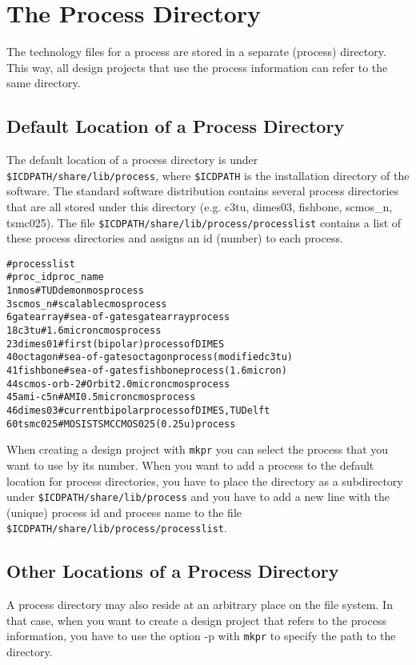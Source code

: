 \chapter{The Process Directory}

The technology files for a process are stored in a separate (process) directory.
This way, all design projects that use the process information can refer to
the same directory.

\section{Default Location of a Process Directory} 

The default location of a process directory is under
\texttt{\$ICDPATH/share/lib/process},
where \texttt{\$ICDPATH} is the installation directory of the software.
The standard software distribution contains several process directories
that are all stored under this directory
(e.g. c3tu, dimes03, fishbone, scmos\_n, tsmc025).
The file \texttt{\$ICDPATH/share/lib/process/processlist} contains a list of these
process directories and assigns an id (number) to each process.
\begin{alltt}
% cat /usr/cacd/share/lib/process/processlist
# process list
# proc_id proc_name
1  nmos      # TUD demo nmos process
3  scmos_n   # scalable cmos process
6  gatearray # sea-of-gates gatearray process
18 c3tu      # 1.6 micron cmos process
23 dimes01   # first (bipolar) process of DIMES
40 octagon   # sea-of-gates octagon process (modified c3tu)
41 fishbone  # sea-of-gates fishbone process (1.6 micron)
44 scmos-orb-2 # Orbit 2.0 micron cmos process
45 ami-c5n   # AMI 0.5 micron cmos process
46 dimes03   # current bipolar process of DIMES, TU Delft
60 tsmc025   # MOSIS TSMC CMOS025 (0.25u) process
\end{alltt}

When creating a design project with 
\texttt{mkpr}
you can select the process that you want to use by its number.
When you want to add a process to the default location for process
directories, you have to place the directory as a subdirectory 
under \texttt{\$ICDPATH/share/lib/process} and you have to add a new line
with the (unique) process id and process name to the file
\texttt{\$ICDPATH/share/lib/process/processlist}.

\section{Other Locations of a Process Directory} 

A process directory may also reside at an arbitrary place on the 
file system.
In that case, when you want to create a design project that refers
to the process information, you have to use the option -p with
\texttt{mkpr}
to specify the path to the directory.
